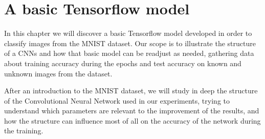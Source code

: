\chapter{A basic Tensorflow model}\label{ch:basic_tf_model}

In this chapter we will discover a basic Tensorflow model developed in order to classify images from the MNIST dataset. Our scope is to illustrate the structure of a \acsp{CNN} and how that basic model can be readjust as needed, gathering data about training accuracy during the epochs and test accuracy on known and unknown images from the dataset.

After an introduction to the MNIST dataset, we will study in deep the structure of the Convolutional Neural Network used in our experiments, trying to understand which parameters are relevant to the improvement of the results, and how the structure can influence most of all on the accuracy of the network during the training.